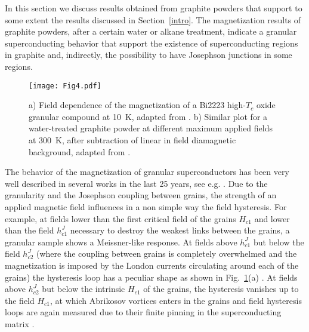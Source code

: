 \documentclass[aps,dvipsnames,twocolumn,floatfix,amsmath]{revtex4-1}
\begin{document}
In this section we discuss results obtained from graphite powders
that support to some extent  the results discussed in
Section~\ref{intro}. The magnetization results of graphite
powders, after a certain water or alkane treatment, indicate a
granular superconducting behavior that support the existence of
superconducting regions in graphite and, indirectly, the
possibility to have Josephson junctions in some regions.

\begin{figure}
  \texttt{[image: Fig4.pdf]}
\caption{a) Field dependence of the magnetization of a Bi2223
high-$T_c$ oxide granular compound at 10~K, adapted from \cite{and01}. b)
Similar plot for a water-treated graphite powder at different
maximum applied fields at 300~K, after subtraction of linear in field diamagnetic
background, adapted from \cite{sch12}.}
\label{fig4}       %
\end{figure}

The behavior of the magnetization of granular superconductors has
been very well described in several works in the last 25 years,
see e.g. \cite{and01,sen91}. Due to the granularity and the
Josephson coupling between grains, the strength of an applied
magnetic field influences in a non simple way the field
hysteresis. For example, at fields lower than the first critical
field of the grains $H_{c1}$ and lower than the field $h_{c1}^J$
necessary to destroy the weakest links between the grains, a
granular  sample shows a Meissner-like response. At fields
above $h_{c1}^J$ but below the field $h_{c2}^J$ (where the
coupling between grains is completely overwhelmed and the
magnetization is imposed by the London currents circulating around
each of the grains) the hysteresis loop has a peculiar shape as
shown in Fig.~\ref{fig4}(a) \cite{sen91}. At fields above
$h_{c2}^J$ but below the intrinsic $H_{c1}$ of the grains, the
hysteresis vanishes up to the field $H_{c1}$, at which Abrikosov
vortices enters in the grains and field hysteresis loops are again
measured due to their finite pinning in the superconducting matrix
\cite{sen91}.
\end{document}
